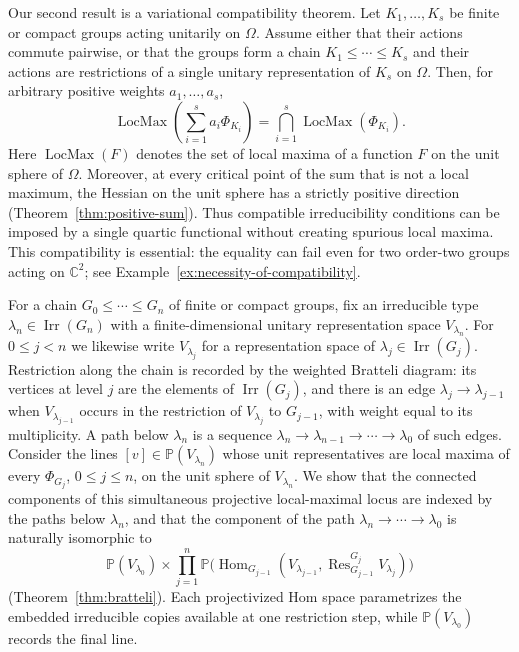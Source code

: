 \documentclass[10pt]{amsart}
\theoremstyle{remark}
\DeclareMathOperator{\Irr}{Irr}
\DeclareMathOperator{\Hom}{Hom}
\DeclareMathOperator{\LocMax}{LocMax}
\DeclareMathOperator{\Res}{Res}
\newcommand{\PP}{\mathbb P}
\begin{document}
Our second result is a variational compatibility theorem. Let $K_1,\ldots,K_s$ be finite or
compact groups acting unitarily on $\Omega$. Assume either that their actions commute pairwise,
or that the groups form a chain $K_1\le\cdots\le K_s$ and their actions are restrictions of a
single unitary representation of $K_s$ on $\Omega$. Then, for arbitrary positive
weights $a_1,\ldots,a_s$,
\begin{equation}\label{eq:intro-positive-sum}
 \LocMax\!\left(\sum_{i=1}^s a_i\Phi_{K_i}\right)
 =\bigcap_{i=1}^s\LocMax(\Phi_{K_i}).
\end{equation}
Here $\LocMax(F)$ denotes the set of local maxima of a function $F$ on the unit sphere of $\Omega$.
Moreover, at every critical point of the sum that is not a local maximum, the Hessian
on the unit sphere has a strictly positive direction
(Theorem~\ref{thm:positive-sum}). Thus compatible irreducibility conditions can be imposed by a single
quartic functional without creating spurious local maxima. This compatibility is essential:
the equality can fail even for two order-two groups
acting on $\mathbb{C}^2$;
see Example~\ref{ex:necessity-of-compatibility}.

For a chain $G_0\leq\cdots\leq G_n$ of finite or compact groups, fix an irreducible type
$\lambda_n\in\Irr(G_n)$ with a finite-dimensional unitary representation space $V_{\lambda_n}$. For
$0\le j<n$ we likewise write $V_{\lambda_j}$ for a representation space of $\lambda_j\in\Irr(G_j)$.
Restriction along the chain is recorded by the weighted Bratteli diagram:
its vertices at level $j$ are the elements of
$\Irr(G_j)$, and there is an edge $\lambda_j\to\lambda_{j-1}$ when $V_{\lambda_{j-1}}$ occurs in the restriction of
$V_{\lambda_j}$ to $G_{j-1}$, with weight equal to its multiplicity. A path below $\lambda_n$ is a sequence
$\lambda_n\to\lambda_{n-1}\to\cdots\to\lambda_0$ of such edges.
Consider the lines $[v]\in\PP(V_{\lambda_n})$ whose unit
representatives are local maxima of every $\Phi_{G_j}$, $0\le j\le n$, on the unit sphere of
$V_{\lambda_n}$. We
show that the connected components of this simultaneous projective local-maximal locus are indexed by the
paths below $\lambda_n$, and that the component of the path $\lambda_n\to\cdots\to\lambda_0$ is naturally
isomorphic to
\[
 \PP(V_{\lambda_0})\times\prod_{j=1}^{n}
 \PP\bigl(\Hom_{G_{j-1}}(V_{\lambda_{j-1}},\Res^{G_j}_{G_{j-1}}V_{\lambda_j})\bigr)
\]
(Theorem~\ref{thm:bratteli}). Each projectivized Hom space parametrizes the embedded irreducible copies
available at one restriction step, while $\PP(V_{\lambda_0})$ records the final line.
\end{document}
